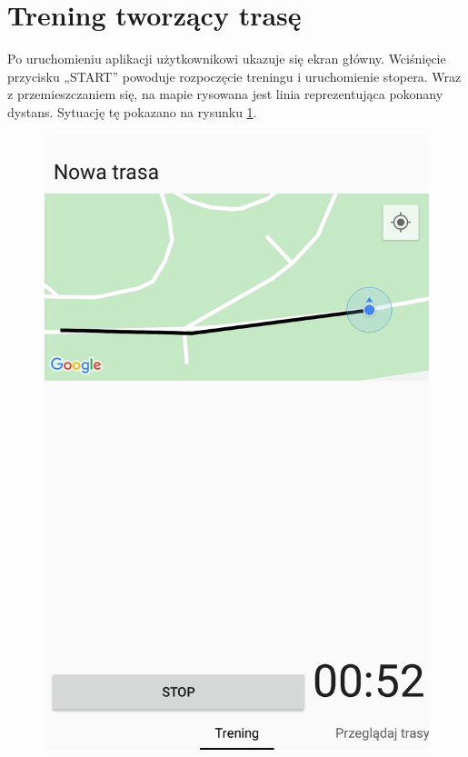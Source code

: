 \section{Trening tworzący trasę}
Po uruchomieniu aplikacji użytkownikowi ukazuje się ekran główny. Wciśnięcie przycisku „START” powoduje rozpoczęcie treningu i uruchomienie stopera. Wraz z przemieszczaniem się, na mapie rysowana jest linia reprezentująca pokonany dystans. Sytuację tę pokazano na rysunku \ref{image:tworzenie-screen}.
\begin{figure}
\centering
\begin{minipage}{.5\textwidth}
  \centering
  \includegraphics[width=.8\linewidth,frame]{img/tworzenie}
  \label{image:tworzenie-screen}
\end{minipage}%
\begin{minipage}{.5\textwidth}
  \centering

\end{minipage}
\end{figure}

